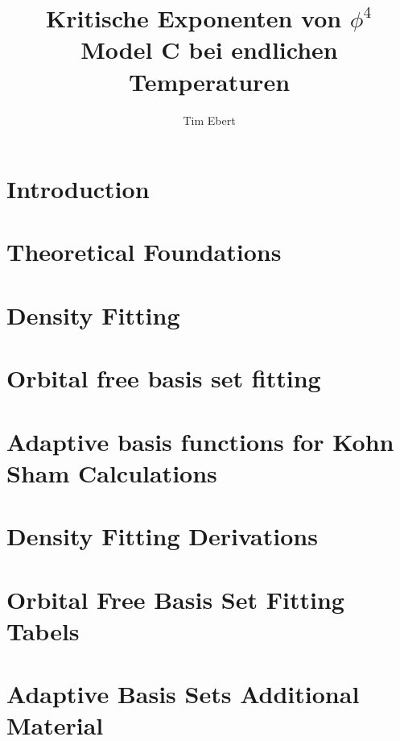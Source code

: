 \documentclass[12pt,twoside]{report}
\author{Tim Ebert}
\title{Kritische Exponenten von $\phi^4$ Model C bei endlichen Temperaturen}
\begin{document}

\newpage
\tableofcontents
\chapter{Introduction}

\chapter{Theoretical Foundations}

\chapter{Density Fitting}

\chapter{Orbital free basis set fitting}

\chapter{Adaptive basis functions for Kohn Sham Calculations}

\begin{appendices}
    \chapter{Density Fitting Derivations}
    
    \chapter{Orbital Free Basis Set Fitting Tabels}
    
    \chapter{Adaptive Basis Sets Additional Material}
    
\end{appendices}
\printbibliography[heading=bibintoc, title={Complete bibliography}]
\clearpage
\newpage
%
\end{document}
